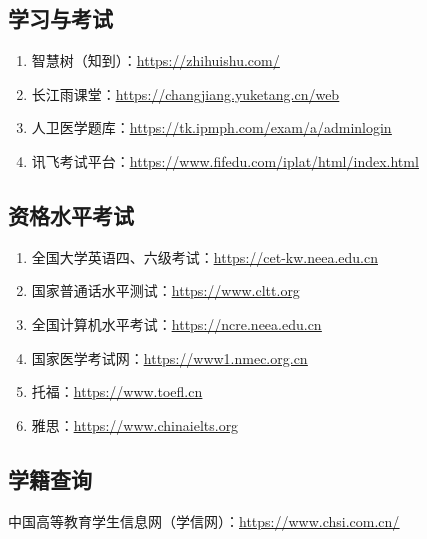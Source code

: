 \subsection[学习与考试]{学习与考试}
\begin{enumerate}
    \item 智慧树（知到）：\uline{\href{https://zhihuishu.com/}{https://zhihuishu.com/}}
    \item 长江雨课堂：\uline{\href{https://changjiang.yuketang.cn/web}{https://changjiang.yuketang.cn/web}}
    \item 人卫医学题库：\uline{\href{https://tk.ipmph.com/exam/a/adminlogin}{https://tk.ipmph.com/exam/a/adminlogin}}
    \item 讯飞考试平台：\uline{\href{https://www.fifedu.com/iplat/html/index.html}{https://www.fifedu.com/iplat/html/index.html}}
\end{enumerate}

\subsection[资格水平考试]{资格水平考试}
\begin{enumerate}
    \item 全国大学英语四、六级考试：\uline{\href{https://cet-kw.neea.edu.cn}{https://cet-kw.neea.edu.cn}}
    \item 国家普通话水平测试：\uline{\href{https://www.cltt.org}{https://www.cltt.org}}
    \item 全国计算机水平考试：\uline{\href{https://ncre.neea.edu.cn}{https://ncre.neea.edu.cn}}
    \item 国家医学考试网：\uline{\href{https://www1.nmec.org.cn}{https://www1.nmec.org.cn}}
    \item 托福：\uline{\href{https://www.toefl.cn}{https://www.toefl.cn}}
    \item 雅思：\uline{\href{https://www.chinaielts.org}{https://www.chinaielts.org}}
\end{enumerate}

\subsection[学籍查询]{学籍查询}
\label{student_status_query}
中国高等教育学生信息网（学信网）：\uline{\href{https://www.chsi.com.cn/}{https://www.chsi.com.cn/}}

\newpage
